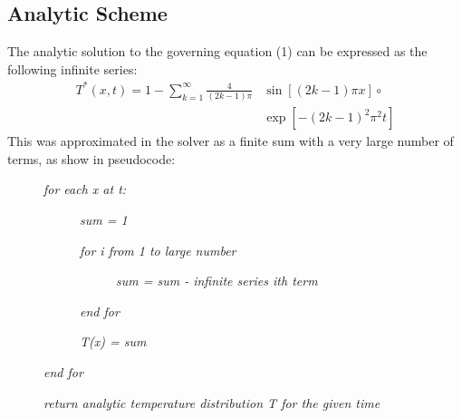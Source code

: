 \documentclass[twocolumn,10pt]{asme2ej}
\begin{document}
\subsection{Analytic Scheme}
The analytic solution to the governing equation (1) can be expressed as the following infinite series:
\begin{equation}
\begin{split}
T^*(x,t) = 1 - \sum\limits_{k=1}^\infty \frac{4}{(2k-1)\pi} & \sin[(2k-1)\pi x] \circ \\
		    &  \exp[-(2k-1)^2\pi^2t]
\end{split}
\end{equation}
\noindent This was approximated in the solver as a finite sum with a very large number of terms, as show in pseudocode:
\begin{description}
\item[] \emph{for each x at t:}
	\begin{description}
	\item[] \emph{sum = 1}
	\item[] \emph{for i from 1 to large number}
		\begin{description}
		\item[] \emph{sum = sum - infinite series ith term}
		\end{description}
	\item[] \emph{end for}
	\item[] \emph{T(x) = sum}
	\end{description}
\item[] \emph{end for}
\item[] \emph{return analytic temperature distribution T for the given time}
\end{description}
\end{document}
